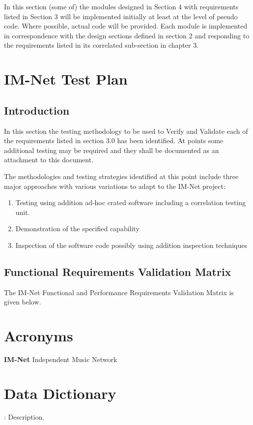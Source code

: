 \documentclass[letterpaper]{article}
\begin{document}
In this section (some of) the modules designed in Section 4 with requirements listed in Section 3 will be implemented initially at least at the level of pseudo code. Where possible, actual code will be provided. Each module is implemented in correspondence with the design sections defined in section 2 and responding to the requirements listed in its correlated sub-section in chapter 3.

\eject 

\section{IM-Net Test Plan}

\subsection{Introduction}

In this section the testing methodology to be used to Verify and Validate each of the requirements listed in section 3.0 has been identified. At points some additional testing may be required and they shall be documented as an attachment to this document. 

The methodologies and testing strategies identified at this point include three major approaches with various variations to adapt to the IM-Net project:

\begin{enumerate}
\item  Testing using addition ad-hoc crated software including a correlation testing unit.

\item  Demonstration of the specified capability

\item  Inspection of the software code possibly using addition inspection techniques
\end{enumerate}

 
\subsection{Functional Requirements Validation Matrix}
The IM-Net Functional and Performance Requirements Validation Matrix is given below.
\eject 
 
\section{Acronyms}
\textbf{IM-Net}  Independent Music Network

\eject 
 
\section{Data Dictionary}

: Description. 
\end{document}

